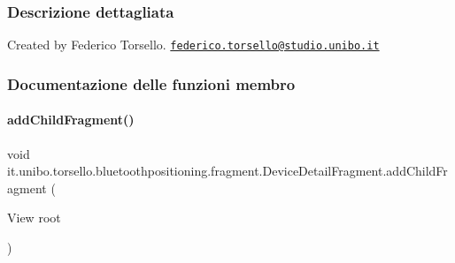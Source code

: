 \subsubsection{Descrizione dettagliata}
Created by Federico Torsello. \href{mailto:federico.torsello@studio.unibo.it}{\tt federico.\+torsello@studio.\+unibo.\+it} 

\subsubsection{Documentazione delle funzioni membro}
\hypertarget{classit_1_1unibo_1_1torsello_1_1bluetoothpositioning_1_1fragment_1_1DeviceDetailFragment_a62c541b8382a522f06a5d9c56cf50b26_a62c541b8382a522f06a5d9c56cf50b26}{}\label{classit_1_1unibo_1_1torsello_1_1bluetoothpositioning_1_1fragment_1_1DeviceDetailFragment_a62c541b8382a522f06a5d9c56cf50b26_a62c541b8382a522f06a5d9c56cf50b26} 
\paragraph{\texorpdfstring{add\+Child\+Fragment()}{addChildFragment()}}
{\footnotesize\ttfamily void it.\+unibo.\+torsello.\+bluetoothpositioning.\+fragment.\+Device\+Detail\+Fragment.\+add\+Child\+Fragment (\begin{DoxyParamCaption}\item[{View}]{root }\end{DoxyParamCaption})\hspace{0.3cm}{\ttfamily [private]}}


